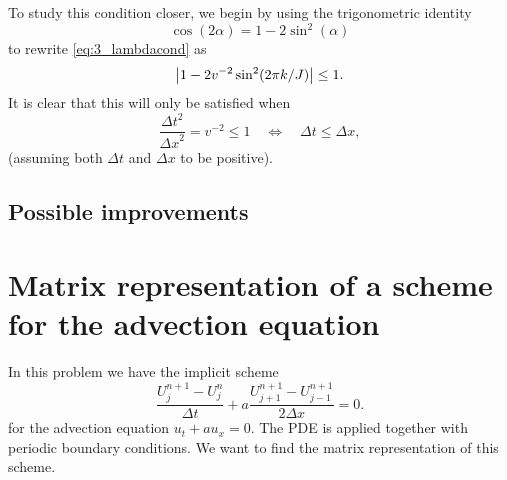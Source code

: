 \documentclass[11pt,letter, swedish, english
]{article}
\newcommand{\Dx}{\ensuremath{\Delta{x}}}
\newcommand{\Dt}{\ensuremath{\Delta{t}}}
\begin{document}
To study this condition closer, we begin by using the trigonometric
identity
\begin{equation}
\cos(2\alpha)=1-2\sin^2(\alpha)
\end{equation}
to rewrite \eqref{eq:3_lambdacond} as
\begin{equation}
\abs{1-2v^{-2}\sin^2(2\pi k/J)}\le1.
\end{equation}
It is clear that this will only be satisfied when
\begin{equation}
\frac{\Dt^2}{\Dx^2}=v^{-2}\le1
\quad\Longleftrightarrow\quad
\Dt\le\Dx,
\end{equation}
(assuming both $\Dt$ and $\Dx$ to be positive).

\subsection{Possible improvements}




\section{Matrix representation of a scheme for the advection equation}
\newcommand{\odelta}[1]{{\mathring{\delta}^{J}_{#1}}}
In this problem we have the implicit scheme
\begin{equation}
\frac{U_j^{n+1}-U_j^n}{\Dt}
+a\frac{U_{j+1}^{n+1}-U_{j-1}^{n+1}}{2\Dx}=0.
\end{equation}
for the advection equation $u_t+au_x=0$. The PDE is applied
together with periodic boundary conditions.
We want to find the matrix representation of this scheme.
\end{document}
